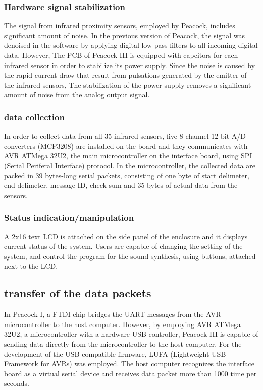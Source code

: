\documentclass{nime-alternate}
\begin{document}
\subsubsection{Hardware signal stabilization} %
The signal from infrared proximity sensors, employed by Peacock, includes significant amount of noise. In the previous version of Peacock, the signal was denoised in the software by applying digital low pass filters to all incoming digital data. However, The PCB of Peacock III is equipped with capcitors for each infrared sensor in order to stabilize its power supply. Since the noise is caused by the rapid current draw that result from pulsations generated by the emitter of the infrared sensors, The stabilization of the power supply removes a significant amount of noise from the analog output signal.

\subsubsection{data collection} %
In order to collect data from all 35 infrared sensors, five 8 channel 12 bit A/D converters (MCP3208) are installed on the board and they communicates with AVR ATMega 32U2, the main microcontroller on the interface board, using SPI (Serial Periferal Interface) protocol. In the microcontroller, the collected data are packed in 39 bytes-long serial packets, consisting of one byte of start delimeter, end delimeter, message ID, check sum and 35 bytes of actual data from the sensors.

\subsubsection{Status indication/manipulation} %

A 2x16 text LCD is attached on the side panel of the enclosure and it displays current status of the system. Users are capable of changing the setting of the system, and control the program for the sound synthesis, using buttons, attached next to the LCD.

\subsection{transfer of the data packets} %

In Peacock I, a FTDI chip bridges the UART messages from the AVR microcontroller to the host computer.
However, by employing AVR ATMega 32U2, a microcontroller with a hardware USB controller, Peacock III is capable of sending data directly from the microcontroller to the host computer. For the development of the USB-compatible firmware, LUFA (Lightweight USB Framework for AVRs)\cite{camera:lufa} was employed. The host computer recognizes the interface board as a virtual serial device and receives data packet more than 1000 time per seconds. 
\end{document}
